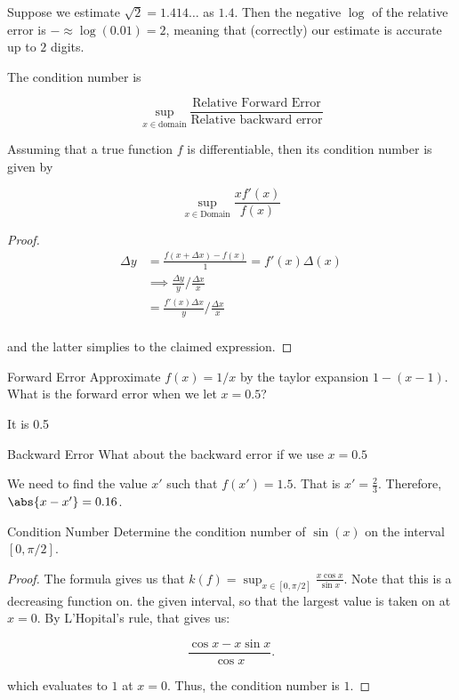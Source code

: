 \documentclass[../main.tex]{subfiles}
\begin{document}
\begin{example}
    Suppose we estimate $\sqrt{2} = 1.414\dots$ as $1.4$. Then the negative $\log$ of the relative error is $-\approx \log(0.01) = 2$, meaning
    that (correctly) our estimate is accurate up to $2$ digits.
\end{example}

\begin{definition}
    The condition number is 

    \[
        \sup_{x \in \text{domain}} \frac{\text{Relative Forward Error}}{\text{Relative backward error}}
    \]
\end{definition}

\begin{theorem}
    Assuming that a true function $f$ is differentiable, then its condition number is given by 

    \[
        \sup_{x \in \text{Domain}}\frac{x f'(x)}{f(x)}
    \]
\end{theorem}

\begin{proof}
    \begin{align*}
        \Delta y &= \frac{f(x + \Delta x) - f(x)}{1} = f'(x) \Delta (x) \\
        &\implies \frac{\Delta y}{y} / \frac{\Delta x}{x}  \\
        &= \frac{f'(x) \Delta x}{y} / \frac{\Delta x}{x}  \\
    \end{align*}

    and the latter simplies to the claimed expression.
\end{proof}


\begin{problem}{Forward Error}
    Approximate $f(x) = 1/x$ by the taylor expansion $1 - (x - 1)$. What is the forward error when we let $x = 0.5$?
\end{problem}

It is 0.5

\begin{problem}{Backward Error}
    What about the backward error if we use $x = 0.5$
\end{problem}
We need to find the value $x'$ such that $f(x') = 1.5$. That is $x' = \frac{2}{3}$. Therefore, $\abs{x - x'} = 0.16$.


\begin{problem}{Condition Number}
    Determine the condition number of $\sin(x)$ on the interval $[0 , \pi/2]$.
\end{problem}
\begin{proof}
    The formula gives us that $k(f) = \sup_{x \in [0, \pi/2]} \frac{x \cos x}{\sin x}$. Note that this is a decreasing function on.
    the given interval, so that the largest value is taken on at $x = 0$. By L'Hopital's rule, that gives us:

    \[
        \frac{\cos x - x \sin x}{\cos x}.
    \]

    which evaluates to $1$ at $x = 0$. Thus, the condition number is $1$.
\end{proof}
\end{document}
